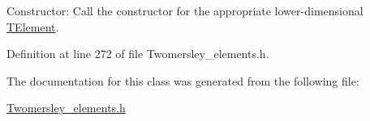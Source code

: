 Constructor\+: Call the constructor for the appropriate lower-\/dimensional \hyperlink{classoomph_1_1TElement}{T\+Element}. 



Definition at line 272 of file Twomersley\+\_\+elements.\+h.



The documentation for this class was generated from the following file\+:\begin{DoxyCompactItemize}
\item 
\hyperlink{Twomersley__elements_8h}{Twomersley\+\_\+elements.\+h}\end{DoxyCompactItemize}
